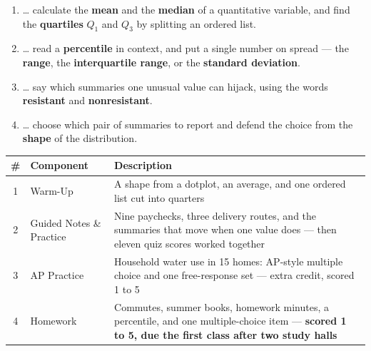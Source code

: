 \documentclass[12pt]{article}
\begin{document}

\namedateperiod
\vspace{0.18in}

\boxguard[14]
\begin{learningtargetbox}
\small
\begin{enumerate}[leftmargin=1.5em, itemsep=5pt]
  \item \ldots{} calculate the \textbf{mean} and the \textbf{median} of a quantitative
        variable, and find the \textbf{quartiles} $Q_1$ and $Q_3$ by splitting an ordered list.
  \item \ldots{} read a \textbf{percentile} in context, and put a single number on spread ---
        the \textbf{range}, the \textbf{interquartile range}, or the \textbf{standard deviation}.
  \item \ldots{} say which summaries one unusual value can hijack, using the words
        \textbf{resistant} and \textbf{nonresistant}.
  \item \ldots{} choose which pair of summaries to report and defend the choice from the
        \textbf{shape} of the distribution.
\end{enumerate}
\end{learningtargetbox}

\vspace{0.14in}

\boxguard[14]
\begin{tocbox}
\small
\renewcommand{\arraystretch}{1.5}
\begin{tabularx}{\linewidth}{@{} c l X @{}}
\rowcolor{sky}
\textbf{\#} & \textbf{Component} & \textbf{Description} \\
\midrule
1 & Warm-Up & A shape from a dotplot, an average, and one ordered list cut into quarters \\
2 & Guided Notes \& Practice & Nine paychecks, three delivery routes, and the summaries that
                 move when one value does --- then eleven quiz scores worked together \\
3 & AP Practice & Household water use in 15 homes: AP-style multiple choice and one
                 free-response set --- extra credit, scored 1 to 5 \\
4 & Homework & Commutes, summer books, homework minutes, a percentile, and one multiple-choice
                 item --- \textbf{scored 1 to 5, due the first class after two study halls} \\
\end{tabularx}
\end{tocbox}
\end{document}
